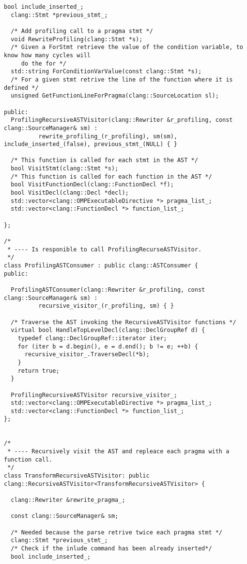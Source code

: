 \documentclass[a4paper,10pt,twoside]{book}
\begin{document}
\begin{lstlisting}[language=CCC, caption=driver/program.h]
  bool include_inserted_;
  clang::Stmt *previous_stmt_;

  /* Add profiling call to a pragma stmt */
  void RewriteProfiling(clang::Stmt *s);
  /* Given a ForStmt retrieve the value of the condition variable, to know how many cycles will
     do the for */
  std::string ForConditionVarValue(const clang::Stmt *s);
  /* For a given stmt retrive the line of the function where it is defined */
  unsigned GetFunctionLineForPragma(clang::SourceLocation sl);

public:
  ProfilingRecursiveASTVisitor(clang::Rewriter &r_profiling, const clang::SourceManager& sm) : 
          rewrite_profiling_(r_profiling), sm(sm), include_inserted_(false), previous_stmt_(NULL) { }
  
  /* This function is called for each stmt in the AST */
  bool VisitStmt(clang::Stmt *s);
  /* This function is called for each function in the AST */
  bool VisitFunctionDecl(clang::FunctionDecl *f);
  bool VisitDecl(clang::Decl *decl);
  std::vector<clang::OMPExecutableDirective *> pragma_list_;
  std::vector<clang::FunctionDecl *> function_list_;
    
};

/*
 * ---- Is responible to call ProfilingRecurseASTVisitor.
 */
class ProfilingASTConsumer : public clang::ASTConsumer { 
public:

  ProfilingASTConsumer(clang::Rewriter &r_profiling, const clang::SourceManager& sm) : 
          recursive_visitor_(r_profiling, sm) { }
  
  /* Traverse the AST invoking the RecursiveASTVisitor functions */
  virtual bool HandleTopLevelDecl(clang::DeclGroupRef d) {
    typedef clang::DeclGroupRef::iterator iter;
    for (iter b = d.begin(), e = d.end(); b != e; ++b) {
      recursive_visitor_.TraverseDecl(*b);
    } 
    return true; 
  }

  ProfilingRecursiveASTVisitor recursive_visitor_;
  std::vector<clang::OMPExecutableDirective *> pragma_list_;
  std::vector<clang::FunctionDecl *> function_list_;
};


/*
 * ---- Recursively visit the AST and repleace each pragma with a function call.
 */
class TransformRecursiveASTVisitor: public clang::RecursiveASTVisitor<TransformRecursiveASTVisitor> {

  clang::Rewriter &rewrite_pragma_;
  
  const clang::SourceManager& sm;

  /* Needed because the parse retrive twice each pragma stmt */
  clang::Stmt *previous_stmt_;
  /* Check if the inlude command has been already inserted*/
  bool include_inserted_;


\end{lstlisting}
\end{document}
